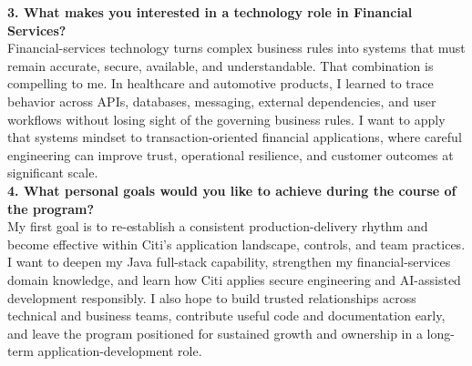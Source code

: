 \documentclass[11pt,letterpaper]{article}
\begin{document}
\textbf{3. What makes you interested in a technology role in Financial Services?}\\[2pt]
Financial-services technology turns complex business rules into systems that must remain accurate, secure, available, and understandable. That combination is compelling to me. In healthcare and automotive products, I learned to trace behavior across APIs, databases, messaging, external dependencies, and user workflows without losing sight of the governing business rules. I want to apply that systems mindset to transaction-oriented financial applications, where careful engineering can improve trust, operational resilience, and customer outcomes at significant scale.\\[5pt]

\textbf{4. What personal goals would you like to achieve during the course of the program?}\\[2pt]
My first goal is to re-establish a consistent production-delivery rhythm and become effective within Citi's application landscape, controls, and team practices. I want to deepen my Java full-stack capability, strengthen my financial-services domain knowledge, and learn how Citi applies secure engineering and AI-assisted development responsibly. I also hope to build trusted relationships across technical and business teams, contribute useful code and documentation early, and leave the program positioned for sustained growth and ownership in a long-term application-development role.
\end{document}
